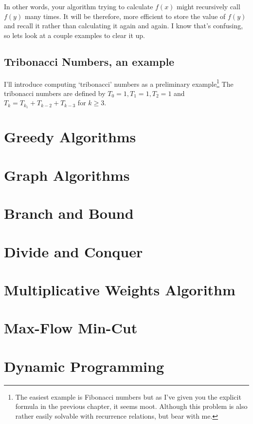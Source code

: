 \documentclass[11pt]{article}
\theoremstyle{plain}
\theoremstyle{definition}
\numberwithin{equation}{section}
\numberwithin{figure}{section}
\begin{document}
\noindent In other words, your algorithm trying to calculate $f(x)$ might recursively call $f(y)$ many times. It will be therefore, more efficient to store the value of $f(y)$ and recall it rather than calculating it again and again. I know that's confusing, so lets look at a couple examples to clear it up. 

\subsection{Tribonacci Numbers, an example}
\noindent I'll introduce computing `tribonacci' numbers as a preliminary example\footnote{The easiest example is Fibonacci numbers but as I've given you the explicit formula in the previous chapter, it seems moot. Although this problem is also rather easily solvable with recurrence relations, but bear with me.} The tribonacci numbers are defined by $T_0 = 1, T_1 = 1, T_2 = 1$ and $T_k = T_{k_1} + T_{k-2} + T_{k - 3}$ for $k \geq 3$.

\newpage
\section{Greedy Algorithms}

\newpage
\section{Graph Algorithms}

\newpage
\section{Branch and Bound}

\newpage
\section{Divide and Conquer}

\newpage
\section{Multiplicative Weights Algorithm}

\newpage
\section{Max-Flow Min-Cut}

\newpage
\section{Dynamic Programming}
\end{document}
